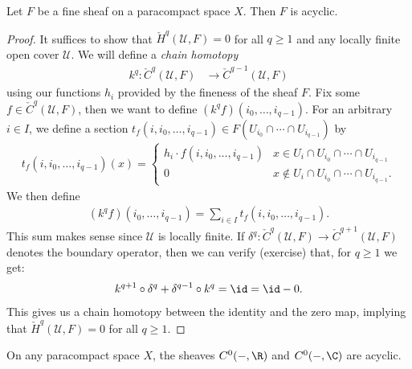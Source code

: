 \documentclass[11pt]{book}
\begin{document}
\begin{theorem}\label{thm:fine-sheaf-on-paracompact-is-acyclic}
Let $F$ be a fine sheaf on a paracompact space $X$. Then $F$ is acyclic.
\end{theorem}
\begin{proof} It suffices to show that $\check{H}^q(\mathcal{U},F)=0$ for all $q\ge1$ and any locally finite open cover $\mathcal{U}$. We will define a \emph{chain homotopy}
\begin{align*}
    k^q \colon \check{C}^q(\mathcal{U},F) &\to \check{C}^{q-1}(\mathcal{U},F)
\end{align*}
using our functions $h_i$ provided by the fineness of the sheaf $F$. Fix some $f\in \check{C}^q(\mathcal{U},F)$, then we want to define $(k^q f)(i_0, \ldots, i_{q-1})$. For an arbitrary $i\in I$, we define a section $t_f(i,i_0, \ldots, i_{q-1}) \in F(U_{i_0}\cap \cdots \cap U_{i_{q-1}})$ by
\begin{align*}
    t_f(i,i_0, \ldots, i_{q-1})(x) = \begin{cases} 
    h_i\cdot f(i,i_0, \ldots, i_{q-1}) &  x\in U_i\cap U_{i_0} \cap \cdots \cap U_{i_{q-1}}\\
   0 & x\notin U_i\cap U_{i_0} \cap \cdots \cap U_{i_{q-1}}. \end{cases}
\end{align*}
We then define
\begin{align*}
    (k^q f)(i_0, \ldots, i_{q-1}) = \sum_{i\in I} t_f(i,i_0, \ldots, i_{q-1}).
\end{align*}
This sum makes sense since $\mathcal{U}$ is locally finite. If $\delta^q \colon \check{C}^q(\mathcal{U},F) \to \check{C}^{q+1}(\mathcal{U},F)$ denotes the boundary operator, then we can verify (exercise) that, for $q\ge 1$ we get:
\begin{align*}
    k^{q+1}\circ \delta^q + \delta^{q-1}\circ k^q = \id = \id-0.
\end{align*}
This gives us a chain homotopy between the identity and the zero map, implying that $\check{H}^q(\mathcal{U},F) = 0$ for all $q\ge 1$.
\end{proof}

\begin{example}
    On any paracompact space $X$, the sheaves $C^0(-,\R)$ and $C^0(-,\C)$ are acyclic.
\end{example}
\end{document}
